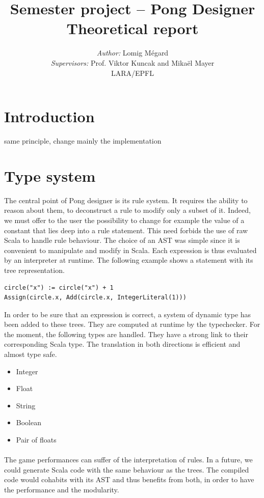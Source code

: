 \documentclass[11pt,a4paper]{article}
\title{Semester project -- Pong Designer\\Theoretical report}
\author{\textit{Author:} Lomig Mégard\\
\textit{Supervisors:} Prof. Viktor Kuncak and Mikaël Mayer\vspace*{0.5cm}\\
\textsc{LARA/EPFL}}
\begin{document}
\maketitle

\section{Introduction}



same principle, change mainly the implementation

\section{Type system}
The central point of Pong designer is its rule system. It requires the ability to reason about them, to deconstruct a rule to modify only a subset of it. Indeed, we must offer to the user the possibility to change for example the value of a constant that lies deep into a rule statement. This need forbids the use of raw Scala to handle rule behaviour. The choice of an AST was simple since it is convenient to manipulate and modify in Scala. Each expression is thus evaluated by an interpreter at runtime. The following example shows a statement with its tree representation.
\begin{lstlisting}
circle("x") := circle("x") + 1
Assign(circle.x, Add(circle.x, IntegerLiteral(1)))
\end{lstlisting}

In order to be sure that an expression is correct, a system of dynamic type has been added to these trees. They are computed at runtime by the typechecker. For the moment, the following types are handled. They have a strong link to their corresponding Scala type. The translation in both directions is efficient and almost type safe.
\begin{itemize}[noitemsep,topsep=2pt,parsep=1pt,partopsep=1pt]
\item Integer
\item Float
\item String
\item Boolean
\item Pair of floats
\end{itemize}

\paragraph*{}
The game performances can suffer of the interpretation of rules. In a future, we could generate Scala code with the same behaviour as the trees. The compiled code would cohabits with its AST and thus benefits from both, in order to have the performance and the modularity.
\end{document}
